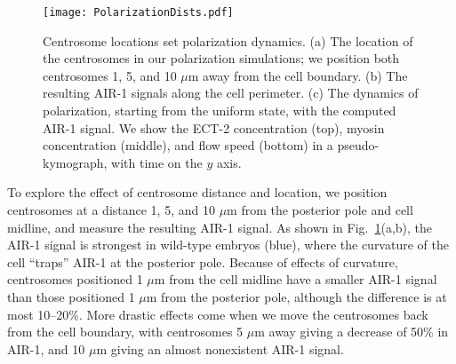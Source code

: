 \documentclass[11pt]{article}
\begin{document}
\begin{figure}
\centering
\texttt{[image: PolarizationDists.pdf]}
\caption{\label{fig:PolLoc}Centrosome locations set polarization dynamics. (a) The location of the centrosomes in our polarization simulations; we position both centrosomes 1, 5, and 10 $\mu$m away from the cell boundary. (b) The resulting AIR-1 signals along the cell perimeter. (c) The dynamics of polarization, starting from the uniform state, with the computed AIR-1 signal. We show the ECT-2 concentration (top), myosin concentration (middle), and flow speed (bottom) in a pseudo-kymograph, with time on the $y$ axis.}
\end{figure}

To explore the effect of centrosome distance and location, we position centrosomes at a distance 1, 5, and 10 $\mu$m from the posterior pole and cell midline, and measure the resulting AIR-1 signal. As shown in Fig.\ \ref{fig:PolLoc}(a,b), the AIR-1 signal is strongest in wild-type embryos (blue), where the curvature of the cell ``traps'' AIR-1 at the posterior pole. Because of effects of curvature, centrosomes positioned 1 $\mu$m from the cell midline have a smaller AIR-1 signal than those positioned 1 $\mu$m from the posterior pole, although the difference is at most 10--20\%. More drastic effects come when we move the centrosomes back from the cell boundary, with centrosomes 5 $\mu$m away giving a decrease of 50\% in AIR-1, and 10 $\mu$m giving an almost nonexistent AIR-1 signal.
\end{document}
